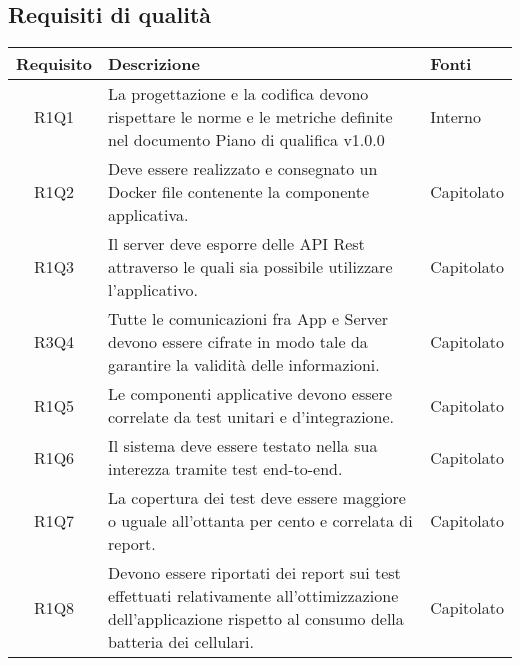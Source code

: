 \begin{center}
\begin{longtable}{|c|p{10cm}|p{4cm}|}
	\end{longtable}
\end{center}
\subsection{Requisiti di qualità}
\begin{center}
	\begin{longtable}{|c|p{10cm}|p{4cm}|}
		\hline
		\rowcolor{lighter-grayer}
		\textbf{Requisito} & \textbf{Descrizione} & \textbf{Fonti}  \\
		\hline
		\endfirsthead
		
		 R1Q1 &La progettazione e la codifica devono rispettare le norme e le metriche definite nel documento Piano di qualifica v1.0.0 & Interno\\
		\hline
		
		R1Q2 &Deve essere realizzato e consegnato un Docker file
		contenente la componente applicativa. & Capitolato\\
		\hline
		R1Q3 &Il server deve esporre delle API Rest attraverso le quali sia possibile utilizzare l'applicativo. & Capitolato\\
		\hline
		R3Q4 &Tutte le comunicazioni fra App e Server devono essere cifrate in modo tale da garantire la validità delle informazioni. & Capitolato\\
		\hline
		R1Q5 &Le componenti applicative devono essere correlate da test unitari e d’integrazione. & Capitolato\\
		\hline
		R1Q6 &Il sistema deve essere testato nella sua interezza tramite test end-to-end. & Capitolato\\
		\hline
		R1Q7 &La copertura dei test deve essere maggiore o uguale all'ottanta per cento e correlata di report. & Capitolato\\
		\hline
		R1Q8 &Devono essere riportati dei report sui test effettuati relativamente all’ottimizzazione dell’applicazione rispetto al consumo della
		batteria dei cellulari. & Capitolato\\
		\hline
		
	\end{longtable}
\end{center}
